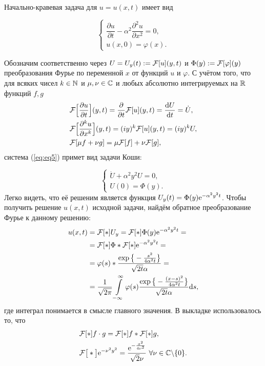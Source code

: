 Начально-кравевая задача для $u=u(x, t)$ имеет вид

\begin{equation} \label{eq:eq5}
\begin{cases}

\displaystyle
\dfrac{\partial u}{\partial t} - \alpha ^2 \dfrac{\partial ^2 u}{\partial x^2} = 0,\\
u(x, 0) = \varphi (x).

\end{cases}
\end{equation}

Обозначим соответственно через $U = U_y (t) := \mathcal{F} [u](y, t)$ и $\Phi (y) := \mathcal{F} [\varphi](y)$ преобразования Фурье по переменной $x$ от функций $u$ и $\varphi$. С учётом того, что для всяких чисел $k \in \mathbb{N}$ и $\mu, \nu \in \mathbb{C}$ и любых абсолютно интегрируемых на $\mathbb{R}$ функций $f, g$ 
\[
\begin{split}
& \mathcal{F} \Big[  \dfrac{\partial u}{\partial t}  \Big](y, t) = \dfrac{\partial}{\partial t} \mathcal{F} [u](y, t) = \dfrac{\mathrm{d} U}{\mathrm{d} t} = \dot{U},\\
& \mathcal{F} \Big[  \dfrac{\partial ^k u}{\partial x^k}  \Big](y, t)  = (iy)^k \mathcal{F} [u](y, t) = (iy)^k U,\\
& \mathcal{F} [\mu f + \nu g] = \mu \mathcal{F} [f] + \nu \mathcal{F} [g],
\end{split}
\]
система (\ref{eq:eq5})  примет вид задачи Коши:

\begin{equation} \label{eq:eq6}
\begin{cases}
\displaystyle
\dot{U} + \alpha ^2 y^2 U = 0,\\
U(0) = \Phi (y).
\end{cases}
\end{equation}
Легко видеть, что её решеним является функция $U_y (t) = \Phi (y) \mathrm{e} ^{-\alpha ^2 y^2 t}$. Чтобы получить решение $u(x, t)$ исходной задачи, найдём обратное преобразование Фурье к данному решению:
\[
\begin{split}
\displaystyle
u(x, t) & = \mathcal{F} [*]{U_y} = \mathcal{F} [*]{\Phi (y) \mathrm{e}^{-\alpha ^2 y^2 t}} =\\
& = \mathcal{F} [*]{\Phi} * \mathcal{F} [*]{\mathrm{e}^{-\alpha ^2 y^2 t}} =\\
& = \varphi (s) * \dfrac{\exp \big\{ -\frac{s^2}{4\alpha ^2 t} \big\}}{\sqrt{2t} \alpha} =\\
& = \dfrac{1}{\sqrt{2 \pi}} \int \limits _{-\infty}^\infty \varphi (s) \dfrac{\exp \big\{ -\frac{(x-s)^2}{4\alpha ^2 t} \big\}}{\sqrt{2t} \alpha} \mathrm{d} s,
\end{split}
\]
где интеграл понимается в смысле главного значения. В выкладке использовалось то, что
\[
\begin{split}
& \mathcal{F} [*]{f \cdot g} = \mathcal{F} [*]{f} * \mathcal{F} [*]{g},\\
& \mathcal{F} \big[ * \big]{\mathrm{e}^{-\nu ^2 y^2}} = \dfrac{\mathrm{e} ^ {-\frac{x^2}{4\nu ^2}}}{\sqrt{2} \nu}\ \forall \nu \in \mathbb{C} \backslash \{ 0 \}.\\
\end{split}
\]


